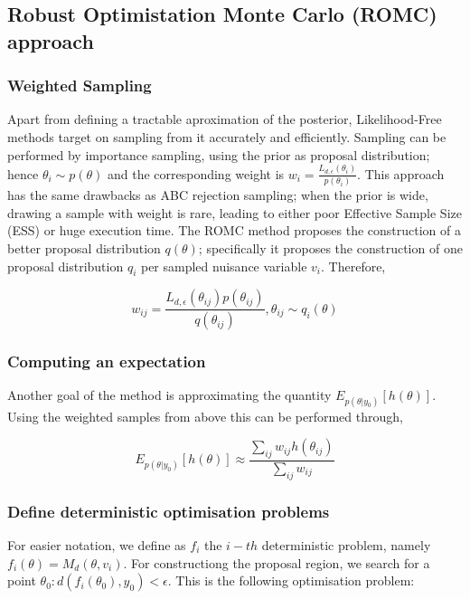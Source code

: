 \documentclass[11pt,twoside]{article}
\numberwithin{Theorem}{section}
\numberwithin{Definition}{section}
\numberwithin{Lemma}{section}
\numberwithin{Algorithm}{section}
\numberwithin{equation}{section}
\begin{document}
\subsection{Robust Optimistation Monte Carlo (ROMC) approach}
\label{sec:ROMC}

\subsubsection*{Weighted Sampling}

Apart from defining a tractable aproximation of the posterior, Likelihood-Free methods target on sampling from it accurately and efficiently. Sampling can be performed by importance sampling, using the prior as proposal distribution; hence $\theta_i \sim p(\theta)$ and the corresponding weight is $w_i = \frac{L_{d,\epsilon}(\theta_i)}{p(\theta_i)}$. This approach has the same drawbacks as ABC rejection sampling; when the prior is wide, drawing a sample with weight is rare, leading to either poor Effective Sample Size (ESS) or huge execution time. The ROMC method proposes the construction of a better proposal distribution $q(\theta)$; specifically it proposes the construction of one proposal distribution $q_i$ per sampled nuisance variable $v_i$. Therefore,

\begin{equation}
  w_{ij} = \frac{L_{d,\epsilon}(\theta_{ij}) p(\theta_{ij})}{q(\theta_{ij})}, \theta_{ij} \sim q_i(\theta)
 \end{equation}


\subsubsection*{Computing an expectation}

Another goal of the method is approximating the quantity $E_{p(\theta|y_0)}[h(\theta)]$. Using the weighted samples from above this can be performed through,

\begin{equation}
  E_{p(\theta|y_0)}[h(\theta)] \approx \frac{\sum_{ij} w_{ij} h(\theta_{ij})}{\sum_{ij} w_{ij}}
 \end{equation}

 
 \subsubsection{Define deterministic optimisation problems}
 
For easier notation, we define as $f_i$ the $i-th$ deterministic problem, namely $f_i(\theta) = M_d(\theta, v_i)$. For constructiong the proposal region, we search for a point $\theta_0 : d(f_i(\theta_0), y_0) < \epsilon$. This is the following optimisation problem:
\end{document}
